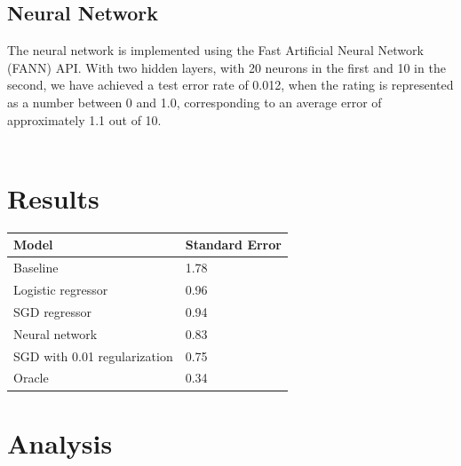 \documentclass[journal]{IEEEtran}
\begin{document}
\subsection{Neural Network}
The neural network is implemented using the Fast Artificial Neural Network (FANN)
API.  With two hidden layers, with 20 neurons in the first and 10 in the second, 
we have achieved a test error rate of 0.012, when the rating is represented as a
number between 0 and 1.0, corresponding to an average error of approximately 1.1 out of 10.  \\
\\

\section{Results}
\smallskip
\begin{center}
\begin{tabular}{|l | l|} %
\hline
Model               & Standard Error  \\ [0.5ex] %
\hline
Baseline            & 1.78 \\
\hline
Logistic regressor  & 0.96 \\
SGD regressor       & 0.94 \\
Neural network      & 0.83 \\
SGD with 0.01 regularization & 0.75 \\
\hline
Oracle              & 0.34 \\
\hline %
\end{tabular}
\end{center}
\smallskip


\section{Analysis}
\end{document}
